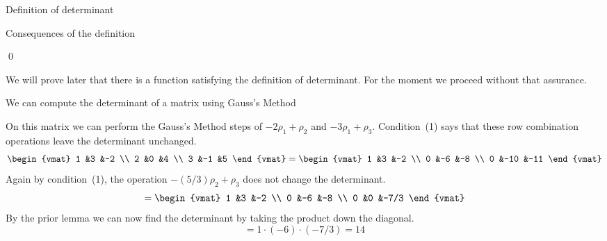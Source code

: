 \documentclass[10pt,t]{beamer}
\begin{document}
\begin{frame}{Definition of determinant}

\pause 
{}%
\end{frame}




\begin{frame}{Consequences of the definition}
\lm[le:IdenRowsDetZero]

\pause 
\pf 
{}

\pause
{}
\end{frame}
\begin{frame}

\pause
{}  
\end{frame}
\begin{frame}
\qed
\end{frame}




\begin{frame}
We will prove later that there is a function satisfying the definition 
of determinant. 
For the moment we proceed without that assurance.

We can compute the determinant of a matrix using Gauss's Method

\ex  On this matrix we can perform the Gauss's Method steps of
$-2\rho_1+\rho_2$ and $-3\rho_1+\rho_3$.
Condition~(1) says that these row combination operations
leave the determinant unchanged.
\begin{equation*}
  \begin{vmat}
    1  &3  &-2 \\
    2  &0  &4  \\
    3  &-1 &5
  \end{vmat}
  =
  \begin{vmat}
    1  &3   &-2 \\
    0  &-6  &-8  \\
    0  &-10 &-11
  \end{vmat}
\end{equation*}
\pause
Again by condition~(1), the operation
$-(5/3)\rho_2+\rho_3$ does not change the determinant.
\begin{equation*}
  =
  \begin{vmat}
    1  &3   &-2 \\
    0  &-6  &-8  \\
    0  &0   &-7/3
  \end{vmat}
\end{equation*}
\pause
By the prior lemma we can now 
find the determinant by taking the product down the
diagonal.
\begin{equation*}
  =1\cdot(-6)\cdot(-7/3)=14
\end{equation*}
\end{frame}
\end{document}
